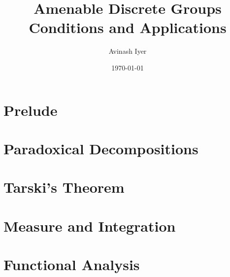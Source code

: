 \documentclass[12pt]{package2}
\title{Amenable Discrete Groups\\ {\large Conditions and Applications}}
\author{Avinash Iyer}
\date{\today}
\begin{document}
\maketitle
\tableofcontents
\RaggedRight
\chapter{Prelude}
\chapter{Paradoxical Decompositions}

\chapter{Tarski's Theorem}

\appendix
\chapter{Measure and Integration}

\chapter{Functional Analysis}
\nocite{*}
\printbibliography
\end{document}
